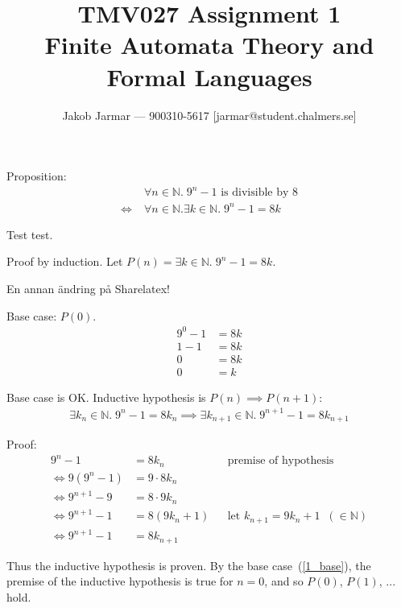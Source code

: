 \documentclass{article}
\title{TMV027 Assignment 1 \\ Finite Automata Theory and Formal Languages}
\author{Jakob Jarmar --- 900310-5617 [jarmar@student.chalmers.se]}
\date{}
\begin{document}
\maketitle

\section{}
Proposition:
\begin{equation}
\begin{split}
& \forall n \in \mathbb{N}.\; 9^n - 1 \text{ is divisible by } 8 \\
\iff \; & \forall n \in \mathbb{N} . \exists k \in \mathbb{N}.\; 9^n - 1 = 8k
\end{split}
\end{equation}

Test test.

Proof by induction. Let $P(n) = \exists k \in \mathbb{N}.\; 9^n - 1 = 8k$.

En annan ändring på Sharelatex!

Base case: $P(0)$.
\begin{equation} \label{1_base}
\begin{split}
9^0 - 1 & = 8k \\
1 - 1 & = 8k \\
0 & = 8k \\
0 & = k
\end{split}
\end{equation}

Base case is OK. Inductive hypothesis is $P(n) \implies P(n+1)$:
\begin{equation}
\begin{split}
\exists k_n \in \mathbb{N} .\; 9^n - 1 = 8k_n \implies \exists k_{n+1} \in \mathbb{N}.\; 9^{n+1} - 1 = 8k_{n+1}
\end{split}
\end{equation}

Proof:
\begin{align}
9^n - 1 & = 8k_n && \text{premise of hypothesis} \\
\iff 9(9^n - 1) & = 9 \cdot 8k_n \\
\iff 9^{n+1} - 9 & = 8 \cdot 9k_n \\
\iff 9^{n+1} - 1 & = 8(9k_n + 1) && \text{let $k_{n+1} = 9k_n+1 \;\; (\in \mathbb{N})$} \\
\iff 9^{n+1} - 1 & = 8k_{n+1}
\end{align}

Thus the inductive hypothesis is proven. By the base case~(\ref{1_base}), the premise of the inductive hypothesis is true for $n = 0$, and so $P(0)$, $P(1)$, ... hold.
\end{document}
